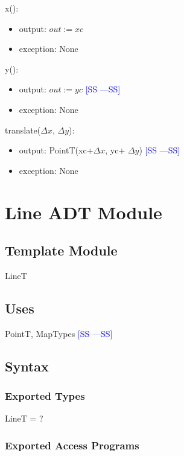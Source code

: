 \documentclass[12pt]{article}
\newcommand{\authornote}[3]{\textcolor{#1}{[#3 ---#2]}}
\newcommand{\authornote}[3]{}
\newcommand{\wss}[1]{\authornote{blue}{SS}{#1}}
\begin{document}
\noindent x():
\begin{itemize}
\item output: $out := xc$
\item exception: None
\end{itemize}

\noindent y():
\begin{itemize}
\item output: $out := yc$ \wss{SS}
\item exception: None
\end{itemize}

\noindent translate($\Delta x$, $\Delta y$):
\begin{itemize}

\item output:  PointT(xc+$\Delta x$, yc+ $\Delta y$) \wss{SS}
\item exception: None 
\end{itemize}

\newpage

\section* {Line ADT Module}

\subsection*{Template Module}

LineT

\subsection* {Uses}

PointT, MapTypes \wss{SS}

\subsection* {Syntax}

\subsubsection* {Exported Types}

LineT = ?

\subsubsection* {Exported Access Programs}
\end{document}
